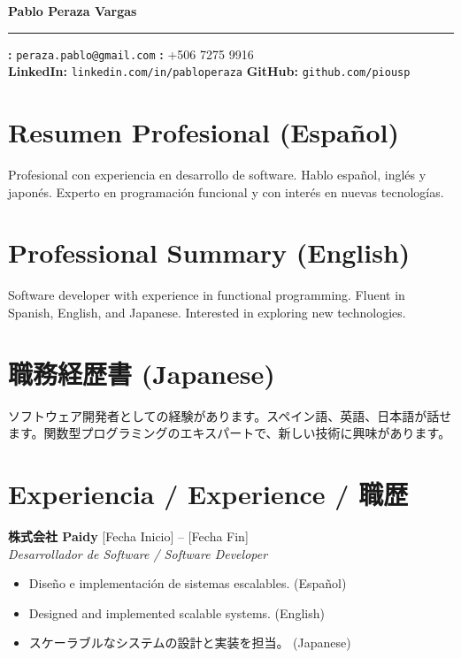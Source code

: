 \documentclass[a4paper,12pt]{article}
\begin{document}
\begin{center}
    {\Large \textbf{Pablo Peraza Vargas}}
    \par\noindent\rule{\textwidth}{1pt}
    \vspace{5pt}
    \textbf{\correo:} \texttt{peraza.pablo@gmail.com} \quad
    \textbf{\tel:} +506 7275 9916 \\
    \textbf{LinkedIn:} \texttt{linkedin.com/in/pabloperaza} \quad
    \textbf{GitHub:} \texttt{github.com/piousp}
\end{center}

\section*{Resumen Profesional (Español)}
Profesional con experiencia en desarrollo de software. Hablo español, inglés y japonés. Experto en programación funcional y con interés en nuevas tecnologías.

\section*{Professional Summary (English)}
Software developer with experience in functional programming. Fluent in Spanish, English, and Japanese. Interested in exploring new technologies.

\section*{職務経歴書 (Japanese)}
ソフトウェア開発者としての経験があります。スペイン語、英語、日本語が話せます。関数型プログラミングのエキスパートで、新しい技術に興味があります。

\section*{Experiencia / Experience / 職歴}
\textbf{株式会社 Paidy} \hfill [Fecha Inicio] -- [Fecha Fin] \\
\emph{Desarrollador de Software / Software Developer} \\
\begin{itemize}
    \item Diseño e implementación de sistemas escalables. (Español)
    \item Designed and implemented scalable systems. (English)
    \item スケーラブルなシステムの設計と実装を担当。 (Japanese)
\end{itemize}
\end{document}
